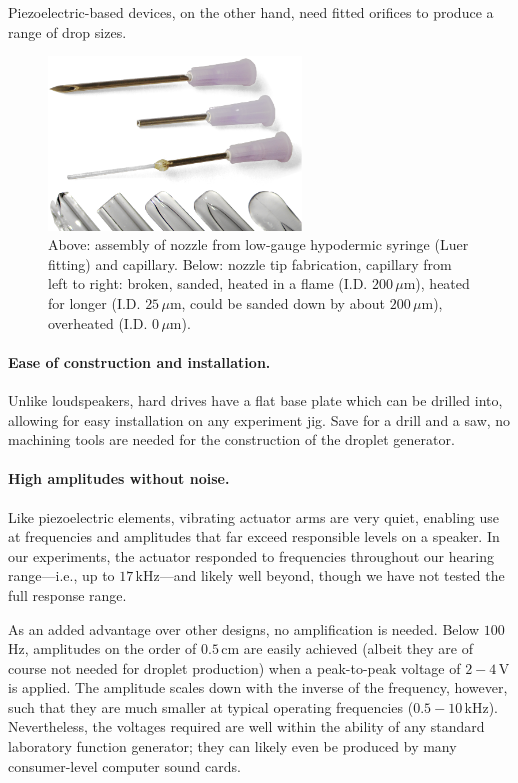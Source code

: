 \documentclass[11.5pt,oneside]{book}
\begin{document}
Piezoelectric-based devices, on the other hand, need fitted orifices to produce a range of
drop sizes.
\begin{figure}
\centering
\includegraphics[width=0.6\textwidth]{papers/hdg_images/needlescombo.eps}
\caption{Above: assembly of nozzle from
low-gauge hypodermic syringe (Luer fitting) and capillary. Below: nozzle tip
fabrication, capillary from left to right: broken, sanded, heated in a flame (I.D.
$200\,\mu$m), heated for longer (I.D. $25\,\mu$m, could be sanded down by about
$200\,\mu$m), overheated (I.D. $0\,\mu$m). \label{fig:needles}}
\end{figure}

\paragraph*{Ease of construction and installation.} Unlike loudspeakers, hard
drives have a flat base plate which can be drilled into, allowing for easy
installation on any experiment jig. Save for a drill and a saw, no machining
tools are needed for the construction of the droplet generator.

\paragraph*{High amplitudes without noise.}
Like piezoelectric elements, vibrating actuator arms are very quiet, enabling
use at frequencies and amplitudes that far exceed responsible levels on
a speaker.  In our experiments, the actuator responded to frequencies throughout
our hearing range---i.e., up to $17\,$kHz---and likely well beyond, though we
have not tested the full response range.

As an added advantage over other designs, no amplification is needed. Below
$100\,$Hz, amplitudes on the order of $0.5\,$cm are easily achieved (albeit they
are of course not needed for droplet production) when a peak-to-peak voltage of
$2-4\,$V is applied. The amplitude scales down with the inverse of the frequency,
however, such that they are much smaller at typical operating frequencies
($0.5-10\,$kHz). Nevertheless, the voltages required are well within the ability
of any standard laboratory function generator; they can likely even be produced by many
consumer-level computer sound cards.
\end{document}
